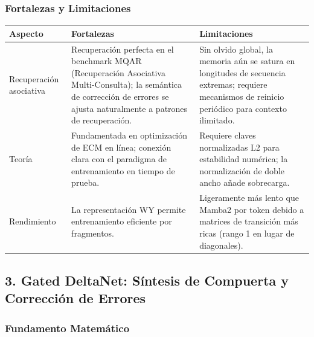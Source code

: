 \subsubsection{Fortalezas y Limitaciones}

\begin{table}[H]
\centering
\small
\begin{tabularx}{0.95\linewidth}{Xp{4cm}p{4cm}}
\toprule
\textbf{Aspecto} & \textbf{Fortalezas} & \textbf{Limitaciones} \\
\midrule
Recuperación asociativa & Recuperación perfecta en el benchmark MQAR (Recuperación Asociativa Multi-Consulta); la semántica de corrección de errores se ajusta naturalmente a patrones de recuperación. & Sin olvido global, la memoria aún se satura en longitudes de secuencia extremas; requiere mecanismos de reinicio periódico para contexto ilimitado. \\
Teoría & Fundamentada en optimización de ECM en línea; conexión clara con el paradigma de entrenamiento en tiempo de prueba. & Requiere claves normalizadas L2 para estabilidad numérica; la normalización de doble ancho añade sobrecarga. \\
Rendimiento & La representación WY permite entrenamiento eficiente por fragmentos. & Ligeramente más lento que Mamba2 por token debido a matrices de transición más ricas (rango 1 en lugar de diagonales). \\
\bottomrule
\end{tabularx}
\end{table}

\subsection{3. Gated DeltaNet: Síntesis de Compuerta y Corrección de Errores}

\subsubsection{Fundamento Matemático}

